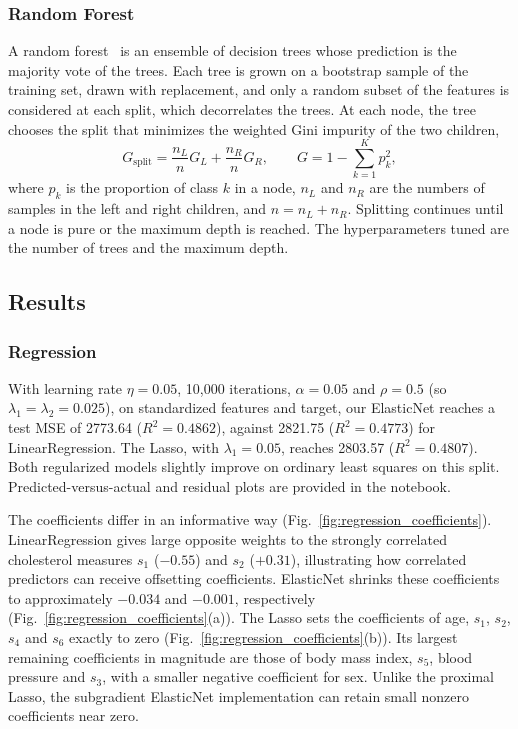 \documentclass[conference]{IEEEtran}
\begin{document}
\subsubsection{Random Forest}
A random forest~\cite{breiman2001} is an ensemble of decision trees whose prediction is the majority vote of the trees. Each tree is grown on a bootstrap sample of the training set, drawn with replacement, and only a random subset of the features is considered at each split, which decorrelates the trees. At each node, the tree chooses the split that minimizes the weighted Gini impurity of the two children,
\begin{equation}
G_{\text{split}} = \frac{n_L}{n}G_L + \frac{n_R}{n}G_R, \qquad G = 1 - \sum_{k=1}^{K}p_k^2,
\end{equation}
where $p_k$ is the proportion of class $k$ in a node, $n_L$ and $n_R$ are the numbers of samples in the left and right children, and $n = n_L + n_R$. Splitting continues until a node is pure or the maximum depth is reached. The hyperparameters tuned are the number of trees and the maximum depth.

\subsection{Results}

\subsubsection{Regression}
With learning rate $\eta=0.05$, 10,000 iterations, $\alpha=0.05$ and $\rho=0.5$ (so $\lambda_1=\lambda_2=0.025$), on standardized features and target, our ElasticNet reaches a test MSE of 2773.64 ($R^2=0.4862$), against 2821.75 ($R^2=0.4773$) for LinearRegression. The Lasso, with $\lambda_1=0.05$, reaches 2803.57 ($R^2=0.4807$). Both regularized models slightly improve on ordinary least squares on this split. Predicted-versus-actual and residual plots are provided in the notebook.

The coefficients differ in an informative way (Fig.~\ref{fig:regression_coefficients}). LinearRegression gives large opposite weights to the strongly correlated cholesterol measures $s_1$ ($-0.55$) and $s_2$ ($+0.31$), illustrating how correlated predictors can receive offsetting coefficients. ElasticNet shrinks these coefficients to approximately $-0.034$ and $-0.001$, respectively (Fig.~\ref{fig:regression_coefficients}(a)). The Lasso sets the coefficients of age, $s_1$, $s_2$, $s_4$ and $s_6$ exactly to zero (Fig.~\ref{fig:regression_coefficients}(b)). Its largest remaining coefficients in magnitude are those of body mass index, $s_5$, blood pressure and $s_3$, with a smaller negative coefficient for sex. Unlike the proximal Lasso, the subgradient ElasticNet implementation can retain small nonzero coefficients near zero.
\end{document}
